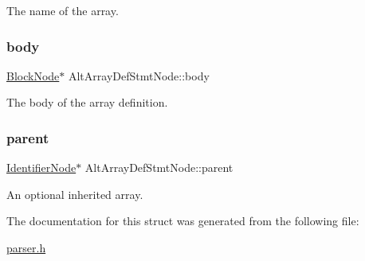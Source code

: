 The name of the array. \mbox{\label{struct_alt_array_def_stmt_node_aca77a8fb42a340a9e2542d27e8155605}} 
\subsubsection{\texorpdfstring{body}{body}}
{\footnotesize\ttfamily \hyperlink{struct_block_node}{Block\+Node}$\ast$ Alt\+Array\+Def\+Stmt\+Node\+::body}

The body of the array definition. \mbox{\label{struct_alt_array_def_stmt_node_a033f2589bae62fc91efe8b60c58ba0d4}} 
\subsubsection{\texorpdfstring{parent}{parent}}
{\footnotesize\ttfamily \hyperlink{parser_8h_a930727769b8a8eb0d24d474f3aa12a43}{Identifier\+Node}$\ast$ Alt\+Array\+Def\+Stmt\+Node\+::parent}

An optional inherited array. 

The documentation for this struct was generated from the following file\+:\begin{DoxyCompactItemize}
\item 
\hyperlink{parser_8h}{parser.\+h}\end{DoxyCompactItemize}
